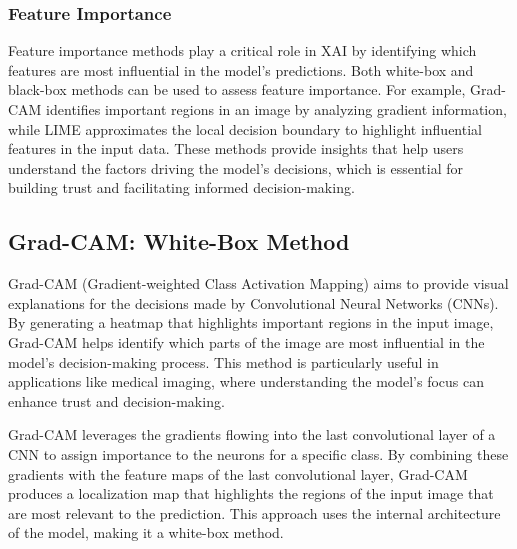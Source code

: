 \documentclass{article}
\begin{document}
\subsubsection{Feature Importance}
Feature importance methods play a critical role in XAI by identifying which features are most influential in the model’s predictions. Both white-box and black-box methods can be used to assess feature importance. For example, Grad-CAM identifies important regions in an image by analyzing gradient information, while LIME approximates the local decision boundary to highlight influential features in the input data. These methods provide insights that help users understand the factors driving the model’s decisions, which is essential for building trust and facilitating informed decision-making.

\subsection{Grad-CAM: White-Box Method}

Grad-CAM (Gradient-weighted Class Activation Mapping) aims to provide visual explanations for the decisions made by Convolutional Neural Networks (CNNs). By generating a heatmap that highlights important regions in the input image, Grad-CAM helps identify which parts of the image are most influential in the model’s decision-making process. This method is particularly useful in applications like medical imaging, where understanding the model’s focus can enhance trust and decision-making.

Grad-CAM leverages the gradients flowing into the last convolutional layer of a CNN to assign importance to the neurons for a specific class. By combining these gradients with the feature maps of the last convolutional layer, Grad-CAM produces a localization map that highlights the regions of the input image that are most relevant to the prediction. This approach uses the internal architecture of the model, making it a white-box method.
\end{document}
